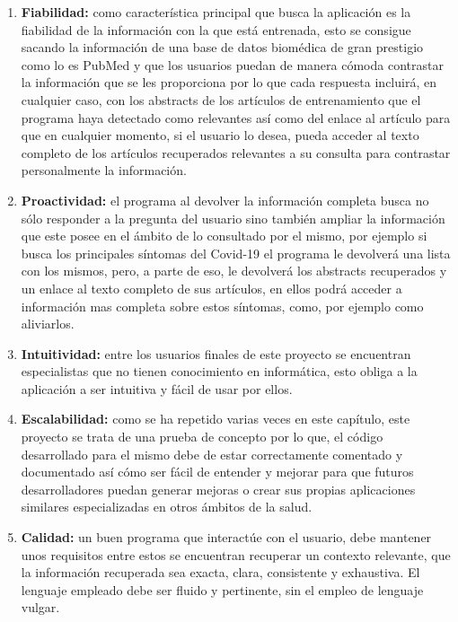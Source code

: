 \begin{enumerate}

    \item \textbf{Fiabilidad:} como característica principal que busca la aplicación es la fiabilidad de la información con la que está entrenada, esto se consigue sacando la información de una base de datos biomédica de gran prestigio como lo es PubMed y que los usuarios puedan de manera cómoda contrastar la información que se les proporciona por lo que cada respuesta incluirá, en cualquier caso, con los abstracts de los artículos de entrenamiento que el programa haya detectado como relevantes así como del enlace al artículo para que en cualquier momento, si el usuario lo desea, pueda acceder al texto completo de los artículos recuperados relevantes a su consulta para contrastar personalmente la información.
    
    \item \textbf{Proactividad:} el programa al devolver la información completa busca no sólo responder a la pregunta del usuario sino también ampliar la información que este posee en el ámbito de lo consultado por el mismo, por ejemplo si busca los principales síntomas del Covid-19 el programa le devolverá una lista con los mismos, pero, a parte de eso, le devolverá los abstracts recuperados y un enlace al texto completo de sus artículos, en ellos podrá acceder a información mas completa sobre estos síntomas, como, por ejemplo como aliviarlos.
    
    \item \textbf{Intuitividad:} entre los usuarios finales de este proyecto se encuentran especialistas que no tienen conocimiento en informática, esto obliga a la aplicación a ser intuitiva y fácil de usar por ellos.

    \item \textbf{Escalabilidad:} como se ha repetido varias veces en este capítulo, este proyecto se trata de una prueba de concepto por lo que, el código desarrollado para el mismo debe de estar correctamente comentado y documentado así cómo ser fácil de entender y mejorar para que futuros desarrolladores puedan generar mejoras o crear sus propias aplicaciones similares especializadas en otros ámbitos de la salud.

    \item \textbf{Calidad:} un buen programa que interactúe con el usuario,  debe mantener unos requisitos entre estos se encuentran recuperar un contexto relevante, que la información recuperada sea exacta, clara, consistente y exhaustiva.
    El lenguaje empleado debe ser fluido y pertinente, sin el empleo de lenguaje vulgar.
    

    
\end{enumerate}
